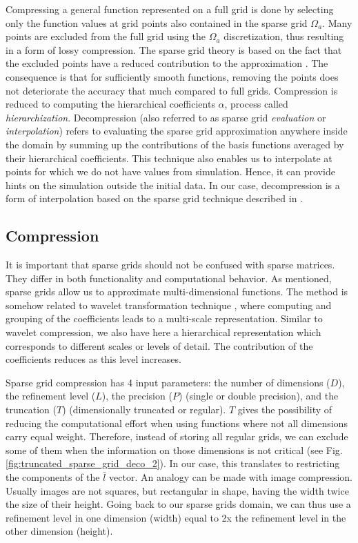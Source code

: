 Compressing a general function represented on a full grid is done by selecting
only the function values at grid points also contained in the sparse grid $\Omega_a$. 
Many points are excluded from the full grid using the $\Omega_a$ discretization, thus resulting
in a form of lossy compression. 
The sparse grid theory is based on the fact that the excluded points have a reduced 
contribution to the approximation \cite{CambridgeJournals:227245}. The consequence is
that for sufficiently smooth functions, removing the points does not deteriorate the
accuracy that much compared to full grids. 
Compression is reduced to computing the hierarchical coefficients $\alpha$, process called
\textit{hierarchization}. Decompression (also referred to as sparse grid \textit{evaluation} or \textit{interpolation}) refers to
evaluating the sparse grid approximation anywhere inside the domain by summing up the
contributions of the basis functions averaged by their hierarchical
coefficients. This technique also enables us to interpolate at points for which
we do not have values from simulation. Hence, it can provide hints on the
simulation outside the initial data. In our case, decompression is a form of
interpolation based on the sparse grid technique described in
\cite{CambridgeJournals:227245}.

\subsection{Compression}

It is important that sparse grids should not be confused with sparse matrices.
They differ in both functionality and computational behavior. As mentioned,
sparse grids allow us to approximate multi-dimensional functions. The method is
somehow related to wavelet transformation technique \cite{Mallat89atheory},
where computing and grouping of the coefficients leads to a multi-scale representation. 
Similar to wavelet compression, we also have here a hierarchical representation which corresponds
to different scales or levels of detail. The contribution of the coefficients reduces as
this level increases.

Sparse grid compression has 4 input parameters: the number of dimensions
($D$), the refinement level ($L$), the
precision ($P$) (single or double precision), and the truncation ($T$)
(dimensionally truncated or regular). $T$ gives the possibility of reducing the
computational effort when using functions where not all dimensions carry
equal weight. Therefore, instead of storing all regular grids, we can exclude
some of them when the information on those dimensions is not critical (see Fig.
\ref{fig:truncated_sparse_grid_deco_2}). In our case, this translates to
restricting the components of the $\bar{l}$ vector. An analogy can be made with
image compression. Usually images are not squares, but rectangular in shape,
having the width twice the size of their height. Going back to our sparse grids
domain, we can thus use a refinement level in one dimension (width) equal to 2x
the refinement level in the other dimension (height).

